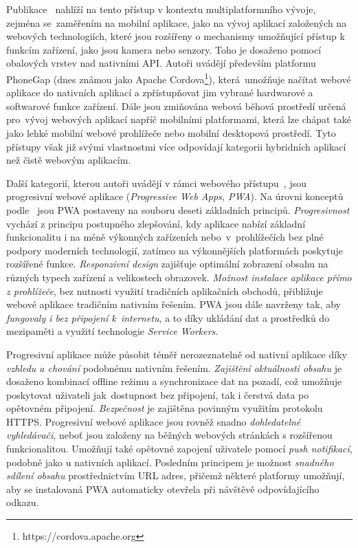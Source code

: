 Publikace~\cite{Taxonomy} nahlíží na tento přístup v kontextu multiplatformního vývoje, zejména se~zaměřením na mobilní aplikace, jako na vývoj aplikací založených na webových technologiích, které jsou rozšířeny o mechanismy umožňující přístup k funkcím zařízení, jako jsou kamera nebo senzory. Toho je dosaženo pomocí obalových vrstev nad nativními API. Autoři uvádějí především platformu PhoneGap (dnes známou jako Apache Cordova\footnote{https://cordova.apache.org}), která~umožňuje načítat webové aplikace do nativních aplikací a zpřístupňovat jim vybrané hardwarové a softwarové funkce zařízení. Dále jsou zmiňována webová běhová prostředí určená pro~vývoj webových aplikací napříč mobilními platformami, která lze chápat také jako lehké mobilní webové prohlížeče nebo mobilní desktopová prostředí. Tyto přístupy však již svými vlastnostmi více odpovídají kategorii hybridních aplikací než čistě webovým aplikacím.

Další kategorií, kterou autoři uvádějí v rámci webového přístupu~\cite{Taxonomy}, jsou progresivní webové aplikace (\textit{Progressive Web Apps, PWA}). Na úrovni konceptů podle~\cite{Pwa} jsou PWA postaveny na souboru deseti základních principů. \textit{Progresivnost} vychází z principu postupného zlepšování, kdy aplikace nabízí základní funkcionalitu i na méně výkonných zařízeních nebo~v~prohlížečích bez plné podpory moderních technologií, zatímco na výkonnějších platformách poskytuje rozšířené funkce. \textit{Responzivní design} zajišťuje optimální zobrazení obsahu na různých typech zařízení a velikostech obrazovek. \textit{Možnost instalace aplikace přímo z prohlížeče}, bez nutnosti využití tradičních aplikačních obchodů, přibližuje webové aplikace tradičním nativním řešením. PWA jsou dále navrženy tak, aby \textit{fungovaly i bez připojení k~internetu}, a to díky ukládání dat a prostředků do mezipaměti a využití technologie \textit{Service Workers}.

Progresivní aplikace může působit téměř nerozeznatelně od nativní aplikace díky \textit{vzhledu a chování} podobnému nativním řešením. \textit{Zajištění aktuálnosti obsahu} je dosaženo kombinací offline režimu a synchronizace dat na pozadí, což umožňuje poskytovat uživateli jak~dostupnost bez připojení, tak i čerstvá data po opětovném připojení. \textit{Bezpečnost} je zajištěna povinným využitím protokolu HTTPS. Progresivní webové aplikace jsou rovněž snadno \textit{dohledatelné vyhledávači}, neboť jsou založeny na běžných webových stránkách s rozšířenou funkcionalitou. Umožňují také opětovné zapojení uživatele pomocí \textit{push notifikací}, podobně jako u nativních aplikací. Posledním principem je možnost \textit{snadného sdílení obsahu} prostřednictvím URL adres, přičemž některé platformy umožňují, aby se instalovaná PWA automaticky otevřela při návštěvě odpovídajícího odkazu.


